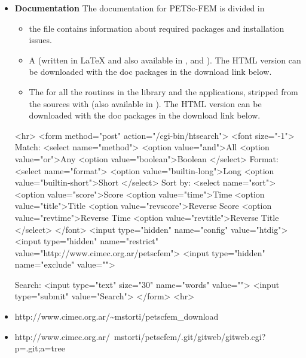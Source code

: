 \documentclass[11pt]{article}
\begin{document}
\begin{itemize}
\item \textbf{Documentation}
The documentation for PETSc-FEM is divided in 

\begin{itemize}
\item the  file contains
information about required packages and installation issues.

\item A 
(written in \LaTeX{} and also available in
, and
). The HTML version can be
downloaded with the doc packages in the download link below. 

\item The  for
all the routines in the library and the applications, stripped from
the sources with
(also available in ). The
HTML version can be downloaded with the doc packages in the download
link below.
\end{itemize}

\begin{rawhtml}
<hr>
<form method="post" action="/cgi-bin/htsearch">
<font size="-1">
Match: <select name="method">
<option value="and">All
<option value="or">Any
<option value="boolean">Boolean
</select>
Format: <select name="format">
<option value="builtin-long">Long
<option value="builtin-short">Short
</select>
Sort by: <select name="sort">
<option value="score">Score
<option value="time">Time
<option value="title">Title
<option value="revscore">Reverse Score
<option value="revtime">Reverse Time
<option value="revtitle">Reverse Title
</select>
</font>
<input type="hidden" name="config" value="htdig">
<input type="hidden" name="restrict" value="http://www.cimec.org.ar/petscfem">
<input type="hidden" name="exclude" value="">

Search:
<input type="text" size="30" name="words" value="">
<input type="submit" value="Search">
</form>
<hr>
\end{rawhtml}

\item {}
                {http://www.cimec.org.ar/\~{}mstorti/petscfem_download}
\item {}
  {http://www.cimec.org.ar/~mstorti/petscfem/.git/gitweb/gitweb.cgi?p=.git;a=tree}

\end{itemize}
\end{document}
